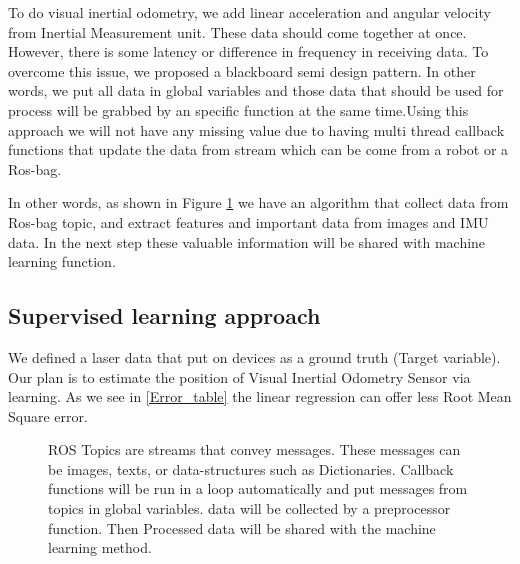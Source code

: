 \documentclass[a4paper,twoside]{article}
\begin{document}
 To do visual inertial odometry, we add linear acceleration and angular velocity from Inertial Measurement unit. These data should come together at once. However, there is some latency or difference in frequency in receiving data. To overcome this issue, we proposed a blackboard semi design pattern. 
 In other words, we put all data in global variables and those data that should be used for process will be grabbed by an specific function at the same time.Using this approach we will not have any missing value due to  having multi thread callback functions that update the data from stream which can be come from a robot or a Ros-bag.
 
 In other words, as shown in Figure \ref{fig:Flowchart} we have an algorithm that collect data from Ros-bag topic, and extract features and important data from images and IMU data. In the next step these valuable information will be shared with machine learning function.
  
 
 \subsection{Supervised learning approach}
 We defined a laser data  that put on devices as a ground truth  (Target variable). Our plan is to estimate the position of Visual Inertial Odometry Sensor  via learning. As we see in \ref{Error_table} the linear regression can offer less Root Mean Square error.
 
 \begin{figure}[!h]
   \centering
    {}
   \caption{ROS Topics are streams that convey messages. These messages can be images, texts, or data-structures such as Dictionaries. Callback functions will be run in a loop automatically and put messages from topics in global variables. data will be collected by a preprocessor function. Then Processed data will be shared with the machine learning method.}
   \label{fig:Flowchart}
  \end{figure}
  
 
 
\end{document}

